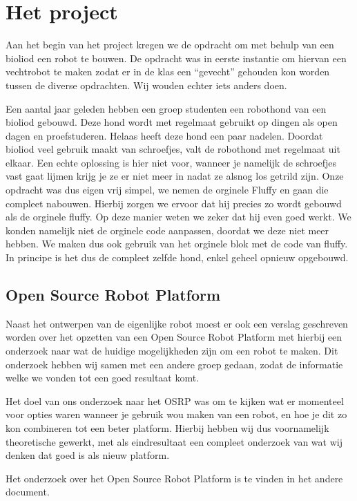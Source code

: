 \chapter{Het project}
Aan het begin van het project kregen we de opdracht om met behulp van een bioliod een robot te bouwen. De opdracht was in eerste instantie om hiervan een vechtrobot te maken zodat er in de klas een ``gevecht'' gehouden kon worden tussen de diverse opdrachten. Wij wouden echter iets anders doen.

Een aantal jaar geleden hebben een groep studenten een robothond van een bioliod gebouwd. Deze hond wordt met regelmaat gebruikt op dingen als open dagen en proefstuderen. Helaas heeft deze hond een paar nadelen. Doordat bioliod veel gebruik maakt van schroefjes, valt de robothond met regelmaat uit elkaar. Een echte oplossing is hier niet voor, wanneer je namelijk de schroefjes vast gaat lijmen krijg je ze er niet meer in nadat ze alsnog los getrild zijn. Onze opdracht was dus eigen vrij simpel, we nemen de orginele Fluffy en gaan die compleet nabouwen. Hierbij zorgen we ervoor dat hij precies zo wordt gebouwd als de orginele fluffy. Op deze manier weten we zeker dat hij even goed werkt. We konden namelijk niet de orginele code aanpassen, doordat we deze niet meer hebben. We maken dus ook gebruik van het orginele blok met de code van fluffy. In principe is het dus de compleet zelfde hond, enkel geheel opnieuw opgebouwd.

\section{Open Source Robot Platform}
Naast het ontwerpen van de eigenlijke robot moest er ook een verslag geschreven worden over het opzetten van een Open Source Robot Platform met hierbij een onderzoek naar wat de huidige mogelijkheden zijn om een robot te maken. Dit onderzoek hebben wij samen met een andere groep gedaan, zodat de informatie welke we vonden tot een goed resultaat komt. 

Het doel van ons onderzoek naar het OSRP was om te kijken wat er momenteel voor opties waren wanneer je gebruik wou maken van een robot, en hoe je dit zo kon combineren tot een beter platform. Hierbij hebben wij dus voornamelijk theoretische gewerkt, met als eindresultaat een compleet onderzoek van wat wij denken dat goed is als nieuw platform.

Het onderzoek over het Open Source Robot Platform is te vinden in het andere document.
